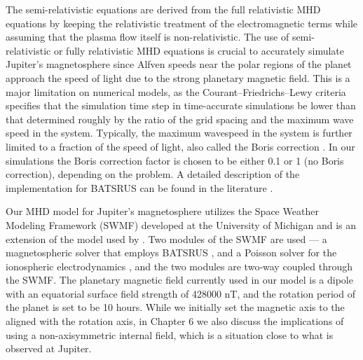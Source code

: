 The semi-relativistic equations are derived from the full relativistic MHD equations \cite{Gombosi2002b} by keeping the relativistic treatment of the electromagnetic terms while assuming that the plasma flow itself is non-relativistic. The use of semi-relativistic or fully relativistic MHD equations is crucial to accurately simulate Jupiter's magnetosphere since Alfven speeds near the polar regions of the planet approach the speed of light due to the strong planetary magnetic field. This is a major limitation on numerical models, as the Courant–Friedrichs–Lewy criteria specifies that the simulation time step in time-accurate simulations be lower than that determined roughly by the ratio of the grid spacing and the maximum wave speed in the system. Typically, the maximum wavespeed in the system is further limited to a fraction of the speed of light, also called the Boris correction \cite{Toth2011}. In our simulations the Boris correction factor is chosen to be either 0.1 or 1 (no Boris correction), depending on the problem. A detailed description of the implementation for BATSRUS can be found in the literature \cite{Gombosi2002b, Toth2012a}.

Our MHD model for Jupiter's magnetosphere utilizes the Space Weather Modeling Framework (SWMF) developed at the University of Michigan \cite{Toth2012a} and is an extension of the model used by \cite{Hansen2001a}. Two modules of the SWMF are used — a magnetospheric solver that employs BATSRUS \cite{Gombosi2002b,Powell1999a}, and a Poisson solver for the ionospheric electrodynamics \cite{Ridley2004IonosphericConductance}, and the two modules are two‐way coupled through the SWMF.  The planetary magnetic field currently used in our model is a dipole with an equatorial surface field strength of 428000 nT, and the rotation period of the planet is set to be 10 hours. While we initially set the magnetic axis to the aligned with the rotation axis, in Chapter 6 we also discuss the implications of using a non-axisymmetric internal field, which is a situation close to what is observed at Jupiter. 

